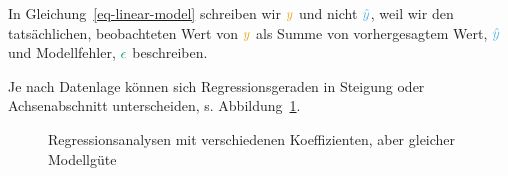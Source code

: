 \documentclass[
  letterpaper,
  twoside,
  open=any]{scrbook}
\theoremstyle{definition}
\theoremstyle{definition}
\theoremstyle{definition}
\theoremstyle{remark}
\begin{document}
In Gleichung~\ref{eq-linear-model} schreiben wir \(\color{ycol}{y}\) und
nicht \(\color{modelcol}{\hat{y}}\), weil wir den tatsächlichen,
beobachteten Wert von \(\color{ycol}{y}\) als Summe von vorhergesagtem
Wert, \(\color{modelcol}{\hat{y}}\) und Modellfehler,
\(\color{errorcol}{\epsilon}\) beschreiben.

Je nach Datenlage können sich Regressionsgeraden in Steigung oder
Achsenabschnitt unterscheiden, s. Abbildung~\ref{fig-regr-div}.

\begin{figure}

\begin{minipage}{0.50\linewidth}



\end{minipage}%
%
\begin{minipage}{0.50\linewidth}



\end{minipage}%

\caption{\label{fig-regr-div}Regressionsanalysen mit verschiedenen
Koeffizienten, aber gleicher Modellgüte}

\end{figure}%
\end{document}
